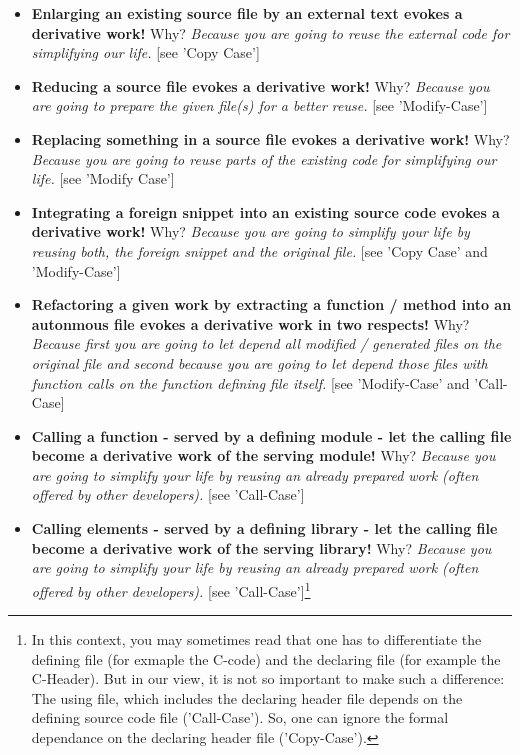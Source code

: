 \begin{itemize}
  \item \textbf{Enlarging an existing source file by an external text evokes a
  derivative work!} Why? \emph{Because you are going to reuse the
  external code for simplifying our life.} [see 'Copy Case']
  \item \textbf{Reducing a source file evokes a derivative work!} Why?
  \emph{Because you are going to prepare the given file(s) for a better reuse.}
  [see 'Modify-Case']
  \item \textbf{Replacing something in a source file evokes a derivative work!}
  Why? \emph{Because you are going to reuse parts of the existing code for
  simplifying our life.} [see 'Modify Case']
  \item \textbf{Integrating a foreign snippet into an existing source code
  evokes a derivative work!} Why? \emph{Because you are going to simplify
  your life by reusing both, the foreign snippet and the original file.} [see
  'Copy Case' and 'Modify-Case']
  \item \textbf{Refactoring a given work by extracting a function / method into
  an autonmous file evokes a derivative work in two respects!} Why?
  \emph{Because first you are going to let depend all modified / generated
  files on the original file and  second because you are going to let
  depend those files with function calls on the function defining file itself.}
  [see 'Modify-Case' and 'Call-Case]
  \item \textbf{Calling a function - served by a defining module - let the
  calling file become a derivative work of the serving module!} Why?
  \emph{Because you are going to simplify your life by reusing an already
  prepared work (often offered by other developers).} [see 'Call-Case']
  \item \textbf{Calling elements - served by a defining library - let the
  calling file become a derivative work of the serving library!} Why? 
  \emph{Because you are going to simplify your life by reusing an already
  prepared work (often offered by other developers).} [see
  'Call-Case']\footnote{In this context, you may sometimes read that one has to
  differentiate the defining file (for exmaple the C-code) and the declaring
  file (for example the C-Header). But in our view, it is not so important to
  make such a difference: The using file, which includes the declaring header
  file depends on the defining source code file ('Call-Case'). So, one can
  ignore the formal dependance on the declaring header file ('Copy-Case').}
\end{itemize}

